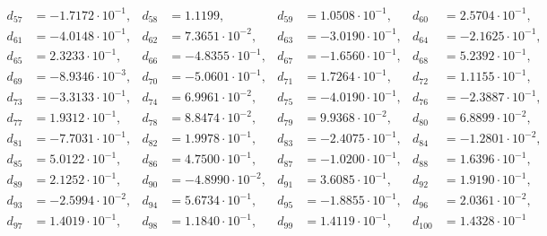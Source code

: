 \begin{align*}
d_{ 57 } &= -1.7172 \cdot 10^{ -1 }, & d_{ 58 } &= 1.1199, & d_{ 59 } &= 1.0508 \cdot 10^{ -1 }, & d_{ 60 } &= 2.5704 \cdot 10^{ -1 },\\ 
d_{ 61 } &= -4.0148 \cdot 10^{ -1 }, & d_{ 62 } &= 7.3651 \cdot 10^{ -2 }, & d_{ 63 } &= -3.0190 \cdot 10^{ -1 }, & d_{ 64 } &= -2.1625 \cdot 10^{ -1 },\\ 
d_{ 65 } &= 2.3233 \cdot 10^{ -1 }, & d_{ 66 } &= -4.8355 \cdot 10^{ -1 }, & d_{ 67 } &= -1.6560 \cdot 10^{ -1 }, & d_{ 68 } &= 5.2392 \cdot 10^{ -1 },\\ 
d_{ 69 } &= -8.9346 \cdot 10^{ -3 }, & d_{ 70 } &= -5.0601 \cdot 10^{ -1 }, & d_{ 71 } &= 1.7264 \cdot 10^{ -1 }, & d_{ 72 } &= 1.1155 \cdot 10^{ -1 },\\ 
d_{ 73 } &= -3.3133 \cdot 10^{ -1 }, & d_{ 74 } &= 6.9961 \cdot 10^{ -2 }, & d_{ 75 } &= -4.0190 \cdot 10^{ -1 }, & d_{ 76 } &= -2.3887 \cdot 10^{ -1 },\\ 
d_{ 77 } &= 1.9312 \cdot 10^{ -1 }, & d_{ 78 } &= 8.8474 \cdot 10^{ -2 }, & d_{ 79 } &= 9.9368 \cdot 10^{ -2 }, & d_{ 80 } &= 6.8899 \cdot 10^{ -2 },\\ 
d_{ 81 } &= -7.7031 \cdot 10^{ -1 }, & d_{ 82 } &= 1.9978 \cdot 10^{ -1 }, & d_{ 83 } &= -2.4075 \cdot 10^{ -1 }, & d_{ 84 } &= -1.2801 \cdot 10^{ -2 },\\ 
d_{ 85 } &= 5.0122 \cdot 10^{ -1 }, & d_{ 86 } &= 4.7500 \cdot 10^{ -1 }, & d_{ 87 } &= -1.0200 \cdot 10^{ -1 }, & d_{ 88 } &= 1.6396 \cdot 10^{ -1 },\\ 
d_{ 89 } &= 2.1252 \cdot 10^{ -1 }, & d_{ 90 } &= -4.8990 \cdot 10^{ -2 }, & d_{ 91 } &= 3.6085 \cdot 10^{ -1 }, & d_{ 92 } &= 1.9190 \cdot 10^{ -1 },\\ 
d_{ 93 } &= -2.5994 \cdot 10^{ -2 }, & d_{ 94 } &= 5.6734 \cdot 10^{ -1 }, & d_{ 95 } &= -1.8855 \cdot 10^{ -1 }, & d_{ 96 } &= 2.0361 \cdot 10^{ -2 },\\ 
d_{ 97 } &= 1.4019 \cdot 10^{ -1 }, & d_{ 98 } &= 1.1840 \cdot 10^{ -1 }, & d_{ 99 } &= 1.4119 \cdot 10^{ -1 }, & d_{ 100 } &= 1.4328 \cdot 10^{ -1 } 
\end{align*}

